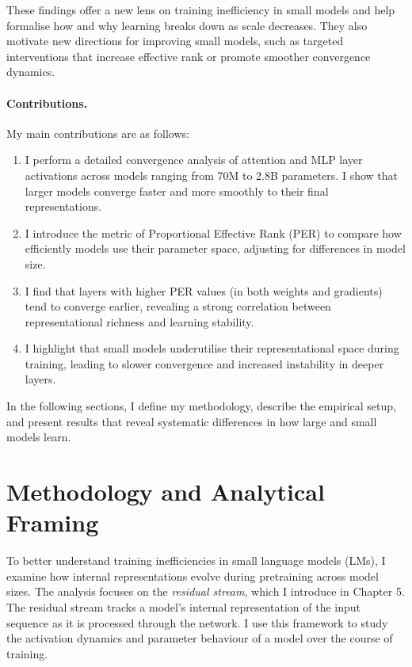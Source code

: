 These findings offer a new lens on training inefficiency in small models and help formalise how and why learning breaks down as scale decreases. They also motivate new directions for improving small models, such as targeted interventions that increase effective rank or promote smoother convergence dynamics.

\paragraph{Contributions.}
My main contributions are as follows:
\begin{enumerate}
    \item I perform a detailed convergence analysis of attention and MLP layer activations across models ranging from 70M to 2.8B parameters. I show that larger models converge faster and more smoothly to their final representations.

    \item I introduce the metric of Proportional Effective Rank (PER) to compare how efficiently models use their parameter space, adjusting for differences in model size.

    \item I find that layers with higher PER values (in both weights and gradients) tend to converge earlier, revealing a strong correlation between representational richness and learning stability.

    \item I highlight that small models underutilise their representational space during training, leading to slower convergence and increased instability in deeper layers.
\end{enumerate}

In the following sections, I define my methodology, describe the empirical setup, and present results that reveal systematic differences in how large and small models learn.

\section{Methodology and Analytical Framing}
\label{sec:methodology}

To better understand training inefficiencies in small language models (LMs), I examine how internal representations evolve during pretraining across model sizes. The analysis focuses on the \textit{residual stream}, which I introduce in Chapter 5. The residual stream tracks a model's internal representation of the input sequence as it is processed through the network. I use this framework to study the activation dynamics and parameter behaviour of a model over the course of training.


